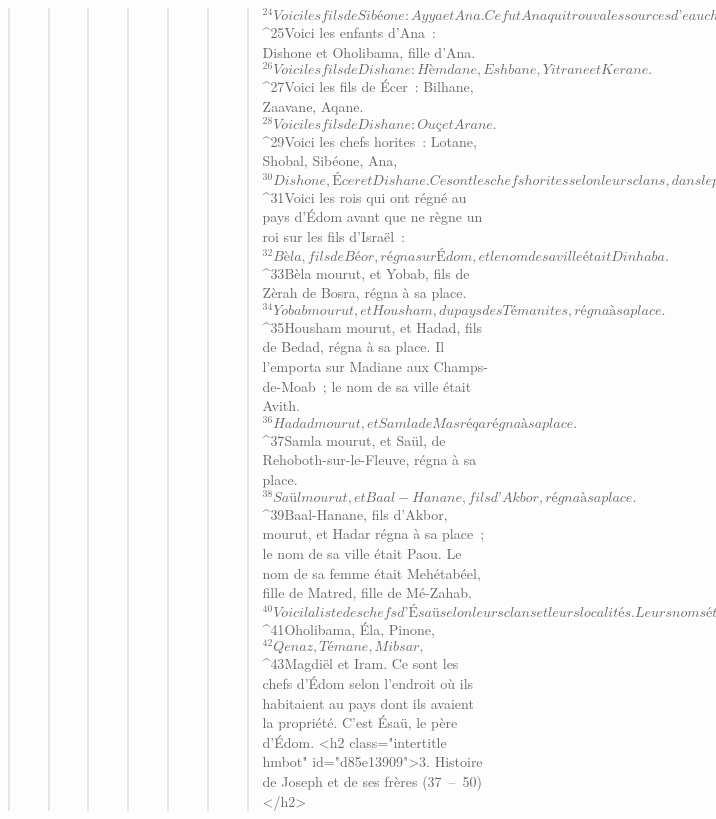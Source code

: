 \begin{verse}
\begin{verse}
\begin{verse}
\begin{verse}
\begin{verse}
\begin{verse}
\begin{verse}
${}^{24}Voici les fils de Sibéone : Ayya et Ana. Ce fut Ana qui trouva les sources d’eau chaude dans le désert, en faisant paître les ânes pour son père Sibéone. 
${}^{25}Voici les enfants d’Ana : Dishone et Oholibama, fille d’Ana. 
${}^{26}Voici les fils de Dishane : Hèmdane, Eshbane, Yitrane et Kerane. 
${}^{27}Voici les fils de Écer : Bilhane, Zaavane, Aqane. 
${}^{28}Voici les fils de Dishane : Ouç et Arane.
${}^{29}Voici les chefs horites : Lotane, Shobal, Sibéone, Ana, 
${}^{30}Dishone, Écer et Dishane. Ce sont les chefs horites selon leurs clans, dans le pays de Séïr.
${}^{31}Voici les rois qui ont régné au pays d’Édom avant que ne règne un roi sur les fils d’Israël : 
${}^{32}Bèla, fils de Béor, régna sur Édom, et le nom de sa ville était Dinhaba. 
${}^{33}Bèla mourut, et Yobab, fils de Zèrah de Bosra, régna à sa place. 
${}^{34}Yobab mourut, et Housham, du pays des Témanites, régna à sa place. 
${}^{35}Housham mourut, et Hadad, fils de Bedad, régna à sa place. Il l’emporta sur Madiane aux Champs-de-Moab ; le nom de sa ville était Avith. 
${}^{36}Hadad mourut, et Samla de Masréqa régna à sa place. 
${}^{37}Samla mourut, et Saül, de Rehoboth-sur-le-Fleuve, régna à sa place. 
${}^{38}Saül mourut, et Baal-Hanane, fils d’Akbor, régna à sa place. 
${}^{39}Baal-Hanane, fils d’Akbor, mourut, et Hadar régna à sa place ; le nom de sa ville était Paou. Le nom de sa femme était Mehétabéel, fille de Matred, fille de Mé-Zahab.
${}^{40}Voici la liste des chefs d’Ésaü selon leurs clans et leurs localités. Leurs noms étaient : Timna, Alva, Yeteth, 
${}^{41}Oholibama, Éla, Pinone, 
${}^{42}Qenaz, Témane, Mibsar, 
${}^{43}Magdiël et Iram. Ce sont les chefs d’Édom selon l’endroit où ils habitaient au pays dont ils avaient la propriété. C’est Ésaü, le père d’Édom.
      <h2 class="intertitle hmbot" id="d85e13909">3. Histoire de Joseph et de ses frères (37 – 50)</h2>
      

\end{verse}
\end{verse}
\end{verse}
\end{verse}
\end{verse}
\end{verse}
\end{verse}
